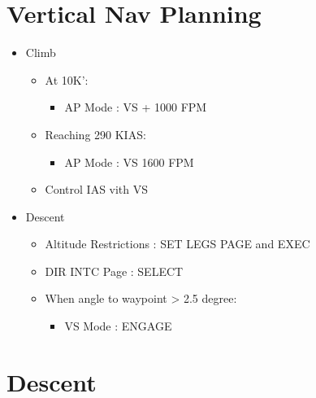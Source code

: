 \section{Vertical Nav Planning}
\label{verticalnavplanning}

\begin{itemize}
\item Climb

\begin{itemize}
\item At 10K':

\begin{itemize}
\item AP Mode : VS + 1000 FPM

\end{itemize}

\item Reaching 290 KIAS:

\begin{itemize}
\item AP Mode : VS 1600 FPM

\end{itemize}

\item Control IAS vith VS

\end{itemize}

\item Descent

\begin{itemize}
\item Altitude Restrictions : SET LEGS PAGE and EXEC

\item DIR INTC Page : SELECT

\item When angle to waypoint > 2.5 degree:

\begin{itemize}
\item VS Mode : ENGAGE

\end{itemize}

\end{itemize}

\end{itemize}

\section{Descent}
\label{descent}

